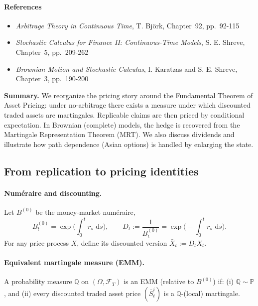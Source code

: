 \documentclass[11pt]{article}
\newcommand{\F}{\mathcal{F}}
\newcommand{\Pbb}{\mathbb{P}}
\newcommand{\Qbb}{\mathbb{Q}}
\newcommand{\dd}{\,\mathrm{d}}
\newcommand{\1}{\mathbf{1}}
\theoremstyle{plain}
\theoremstyle{definition}
\theoremstyle{remark}
\newcommand{\lecturesummary}[1]{%
\begin{center}
\begin{minipage}{0.95\linewidth}
\small\textbf{Summary.} #1
\end{minipage}
\end{center}
\vspace{0.5em}
}
\begin{document}
\paragraph{References}

\begin{itemize}[leftmargin=1.4em]

\item \textit{Arbitrage Theory in Continuous Time},  
T. Björk, Chapter~92, pp.~92-115

\item \textit{Stochastic Calculus for Finance II: Continuous-Time Models},  
S. E. Shreve, Chapter~5, pp.~209-262

\item \textit{Brownian Motion and Stochastic Calculus}, I. Karatzas and S. E. Shreve, Chapter~3, pp.~190-200

\end{itemize}


\lecturesummary{
We reorganize the pricing story around the Fundamental Theorem of Asset Pricing: under no-arbitrage there exists a measure under which discounted traded assets are martingales. Replicable claims are then priced by conditional expectation. In Brownian (complete) models, the hedge is recovered from the Martingale Representation Theorem (MRT). We also discuss dividends and illustrate how path dependence (Asian options) is handled by enlarging the state.}

\subsection{From replication to pricing identities}

\paragraph{Num\'eraire and discounting.}
Let $B^{(0)}$ be the money-market num\'eraire,
\[
B_t^{(0)}=\exp\!\Big(\int_0^t r_s\,\dd s\Big),
\qquad
D_t:=\frac{1}{B_t^{(0)}}=\exp\!\Big(-\int_0^t r_s\,\dd s\Big).
\]
For any price process $X$, define its discounted version $\bar X_t:=D_t X_t$.

\paragraph{Equivalent martingale measure (EMM).}
A probability measure $\Qbb$ on $(\Omega,\F_T)$ is an EMM (relative to $B^{(0)}$) if:
(i) $\Qbb\sim \Pbb$, and (ii) every discounted traded asset price $(\bar S_t^i)$ is a $\Qbb$-(local) martingale.
\end{document}
